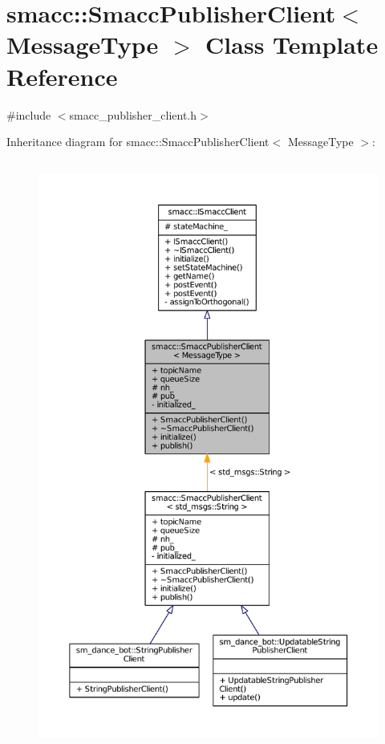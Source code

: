 \hypertarget{classsmacc_1_1SmaccPublisherClient}{}\section{smacc\+:\+:Smacc\+Publisher\+Client$<$ Message\+Type $>$ Class Template Reference}
\label{classsmacc_1_1SmaccPublisherClient}


{\ttfamily \#include $<$smacc\+\_\+publisher\+\_\+client.\+h$>$}



Inheritance diagram for smacc\+:\+:Smacc\+Publisher\+Client$<$ Message\+Type $>$\+:
\nopagebreak
\begin{figure}[H]
\begin{center}
\leavevmode
\includegraphics[height=550pt]{classsmacc_1_1SmaccPublisherClient__inherit__graph}
\end{center}
\end{figure}


